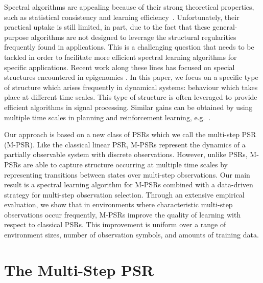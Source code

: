 \documentclass[letterpaper]{article}
\begin{document}
Spectral algorithms are appealing because of their strong theoretical properties, such as statistical consistency and learning efficiency~\cite{hsu09,bailly10}. Unfortunately, their practical uptake is still limited, in part, due to the fact that these general-purpose algorithms are not designed to leverage the structural regularities frequently found in applications. This is a challenging question that needs to be tackled in order to facilitate more efficient spectral learning algorithms for specific applications. Recent work along these lines has focused on special structures encountered in epigenomics \cite{zhang2015spectral}. In this paper, we focus on a specific type of structure which arises frequently in dynamical systems: behaviour which takes place at different time scales. This type of structure is often leveraged to provide efficient algorithms in signal processing. Similar gains can be obtained by using multiple time scales in planning and reinforcement learning, e.g.~\cite{sutton99}.

Our approach is based on a new class of PSRs which we call the multi-step PSR (M-PSR). Like the classical linear PSR, M-PSRs represent the dynamics of a partially observable system with discrete observations. However, unlike PSRs, M-PSRs are able to capture structure occurring at multiple time scales by representing transitions between states over multi-step observations. Our main result is a spectral learning algorithm for M-PSRs combined with a data-driven strategy for multi-step observation selection. Through an extensive empirical evaluation, we show that in environments where characteristic multi-step observations occur frequently, M-PSRs improve the quality of learning with respect to classical PSRs. This improvement is uniform over a range of environment sizes, number of observation symbols, and amounts of training data. 

\section{The Multi-Step PSR}
\end{document}
